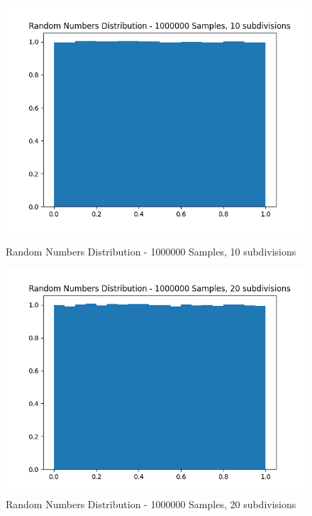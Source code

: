 \documentclass[11pt]{article}
\begin{document}
\begin{figure}[H]
    \centering
    \begin{minipage}{0.48\textwidth}
        \centering
        \includegraphics[width=\textwidth]{Random Numbers Distribution - 1000000 Samples, 10 subdivisions.png}
        \caption{Random Numbers Distribution - 1000000 Samples, 10 subdivisions}
        \label{fig:5}
    \end{minipage}\hfill
    \begin{minipage}{0.48\textwidth}
        \centering
        \includegraphics[width=\textwidth]{Random Numbers Distribution - 1000000 Samples, 20 subdivisions.png}
        \caption{Random Numbers Distribution - 1000000 Samples, 20 subdivisions}
        \label{fig:6}
    \end{minipage}
\end{figure}
\end{document}
